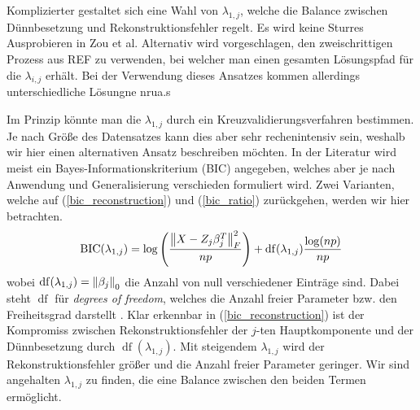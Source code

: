 Komplizierter gestaltet sich eine Wahl von $\lambda_{1,j}$, welche die Balance zwischen Dünnbesetzung und Rekonstruktionsfehler regelt. Es wird keine Sturres Ausprobieren in Zou et al. Alternativ wird vorgeschlagen, den zweischrittigen Prozess aus REF zu verwenden, bei welcher man einen gesamten Lösungspfad für die $\lambda_{i,j}$ erhält. Bei der Verwendung dieses Ansatzes kommen allerdings unterschiedliche Lösungne nrua.s

Im Prinzip könnte man die $\lambda_{1,j}$ durch ein Kreuzvalidierungsverfahren bestimmen. Je nach Größe des Datensatzes kann dies aber sehr rechenintensiv sein, weshalb wir hier einen alternativen Ansatz beschreiben möchten. In der Literatur wird meist ein Bayes-Informationskriterium (BIC) angegeben, welches aber je nach Anwendung und Generalisierung verschieden formuliert wird. Zwei Varianten, welche auf \cite{hubert, allen} (\ref{bic_reconstruction}) und \cite{croux, guo} (\ref{bic_ratio}) zurückgehen, werden wir hier betrachten.
\begin{align}
\label{bic_reconstruction}
\operatorname{BIC}(\lambda_{1,j}) = \log\left(\frac{\left\lVert X - Z_j\beta_j^T \right\rVert_{F}^{2}}{np}\right) + \operatorname{df}(\lambda_{1,j}) \frac{\log(np)}{np}
\end{align}
wobei $\operatorname{df}(\lambda_{1,j}) = \left\lVert \beta_j \right\rVert_0$ die Anzahl von null verschiedener Einträge sind. Dabei steht $\operatorname{df}$ für \textit{degrees of freedom}, welches die Anzahl freier Parameter bzw. den Freiheitsgrad darstellt \cite{hastie_elements}. Klar erkennbar in (\ref{bic_reconstruction}) ist der Kompromiss zwischen Rekonstruktionsfehler der $j$-ten Hauptkomponente und der Dünnbesetzung durch $\operatorname{df}(\lambda_{1,j})$. Mit steigendem $\lambda_{1,j}$ wird der Rekonstruktionsfehler größer und die Anzahl freier Parameter geringer. Wir sind angehalten $\lambda_{1,j}$ zu finden, die eine Balance zwischen den beiden Termen ermöglicht.

